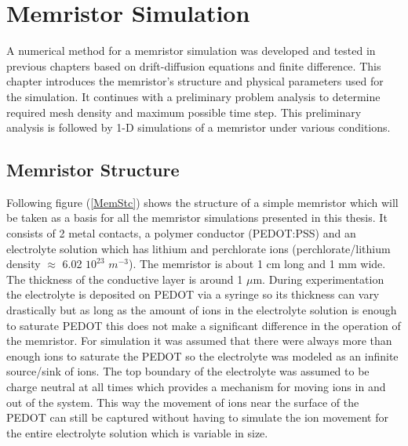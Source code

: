 
\chapter{Memristor Simulation} %

\label{Chapter5} %


\begin{doublespace}

A numerical method for a memristor simulation was developed and tested in previous chapters based on drift-diffusion equations and finite difference. This chapter introduces the memristor's structure and physical parameters used for the simulation. It continues with a preliminary problem analysis to determine required mesh density and maximum possible time step. This preliminary analysis is followed by 1-D simulations of a memristor under various conditions.


\section{Memristor Structure}

Following figure (\ref{MemStc}) shows the structure of a simple memristor which will be taken as a basis for all the memristor simulations presented in this thesis. It consists of 2 metal contacts, a polymer conductor (PEDOT:PSS) and an electrolyte solution which has lithium and perchlorate ions (perchlorate/lithium density $\approx$ 6.02 $10^{23}$ $m^{-3}$). The memristor is about 1 cm long and 1 mm wide. The thickness of the conductive layer is around 1 $\mu$m. During experimentation the electrolyte is deposited on PEDOT via a syringe so its thickness can vary drastically but as long as the amount of ions in the electrolyte solution is enough to saturate PEDOT this does not make a significant difference in the operation of the memristor. For simulation it was assumed that there were always more than enough ions to saturate the PEDOT so the electrolyte was modeled as an infinite source/sink of ions. The top boundary of the electrolyte was assumed to be charge neutral at all times which provides a mechanism for moving ions in and out of the system. This way the movement of ions near the surface of the PEDOT can still be captured without having to simulate the ion movement for the entire electrolyte solution which is variable in size. 


\end{doublespace}
